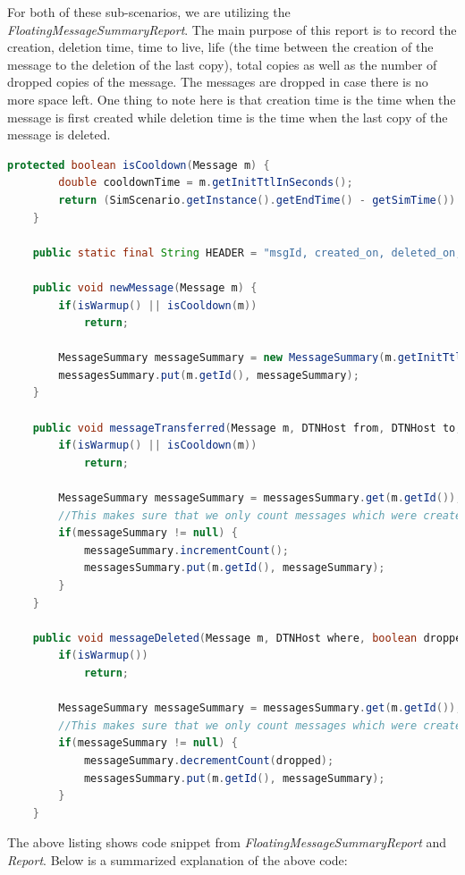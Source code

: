 For both of these sub-scenarios, we are utilizing the \textit{FloatingMessageSummaryReport}. The main purpose of this report is to record the creation, deletion time, time to live, life (the time between the creation of the message to the deletion of the last copy), total copies as well as the number of dropped copies of the message. The messages are dropped in case there is no more space left. One thing to note here is that creation time is the time when the message is first created while deletion time is the time when the last copy of the message is deleted.

\begin{lstlisting}[language=java]
	protected boolean isCooldown(Message m) {
		double cooldownTime = m.getInitTtlInSeconds();
		return (SimScenario.getInstance().getEndTime() - getSimTime()) <= cooldownTime ;
	}

	public static final String HEADER = "msgId, created_on, deleted_on, ttl, life, totalCopies, dropped";

	public void newMessage(Message m) {
		if(isWarmup() || isCooldown(m))
			return;

		MessageSummary messageSummary = new MessageSummary(m.getInitTtlInSeconds());
	    messagesSummary.put(m.getId(), messageSummary);
	}

	public void messageTransferred(Message m, DTNHost from, DTNHost to, boolean firstDelivery) {
		if(isWarmup() || isCooldown(m))
			return;

		MessageSummary messageSummary = messagesSummary.get(m.getId());
		//This makes sure that we only count messages which were created before cooldown
		if(messageSummary != null) {
			messageSummary.incrementCount();
			messagesSummary.put(m.getId(), messageSummary);
		}
	}

	public void messageDeleted(Message m, DTNHost where, boolean dropped) {
		if(isWarmup())
			return;

		MessageSummary messageSummary = messagesSummary.get(m.getId());
		//This makes sure that we only count messages which were created before cooldown
		if(messageSummary != null) {
			messageSummary.decrementCount(dropped);
			messagesSummary.put(m.getId(), messageSummary);
		}
	}
\end{lstlisting}
\vspace{5mm}
The above listing shows code snippet from \textit{FloatingMessageSummaryReport} and \textit{Report}. Below is a summarized explanation of the above code:
